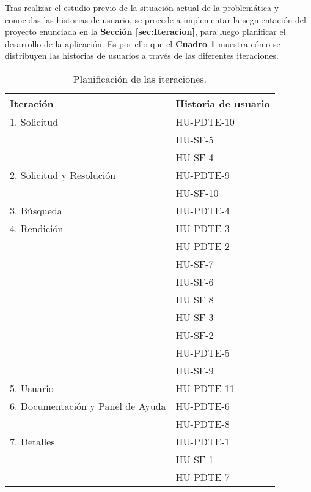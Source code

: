 Tras realizar el estudio previo de la situación actual de la problemática y conocidas las historias de usuario, se procede a implementar la segmentación del proyecto enunciada en la \textbf{Sección \ref{sec:Iteracion}}, para luego planificar el desarrollo de la aplicación. Es por ello que el \textbf{Cuadro \ref{tab: tab_planificacion}} muestra cómo se distribuyen las historias de usuarios a través de las diferentes iteraciones.


\begin{table}[htbp]
    
    \caption{\label{tab: tab_planificacion} Planificación de las iteraciones. }
	\footnotesize
	\centering
    \begin{tabular}{|l|l|}
    
    	\hline
    	\textbf{Iteración} & \textbf{Historia de usuario} \\
    	\hline\hline
    
		1. Solicitud	& 	HU-PDTE-10\\ \cline{2-2}
					&	HU-SF-5 \\ \cline{2-2}
					&	HU-SF-4 \\ \hline

		2. Solicitud y Resolución	& 	HU-PDTE-9\\ \cline{2-2}
					&	HU-SF-10 \\ \hline
					
		3. Búsqueda	& 	HU-PDTE-4 \\ \hline

		4. Rendición	& 	HU-PDTE-3\\ \cline{2-2}
					&	HU-PDTE-2 \\ \cline{2-2}
					&	HU-SF-7 \\ \cline{2-2}
					&	HU-SF-6 \\ \cline{2-2}
					&	HU-SF-8 \\ \cline{2-2}
					&	HU-SF-3 \\ \cline{2-2}
					&	HU-SF-2 \\ \cline{2-2}
					&	HU-PDTE-5 \\ \cline{2-2}
					&	HU-SF-9 \\ \hline

		5. Usuario	& 	HU-PDTE-11 \\ \hline
		
		6. Documentación y Panel de Ayuda	& 	HU-PDTE-6\\ \cline{2-2}
					&	HU-PDTE-8 \\ \hline

		7. Detalles	& 	HU-PDTE-1\\ \cline{2-2}
					&	HU-SF-1 \\ \cline{2-2}
					&	HU-PDTE-7 \\ \hline
    \end{tabular}  
\end{table}